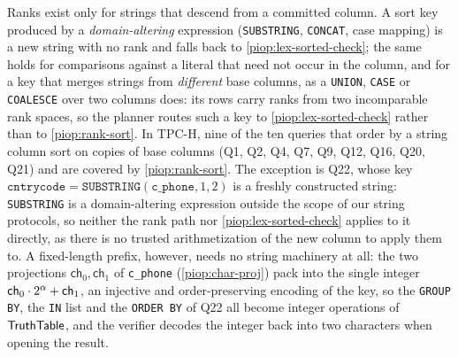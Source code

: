 Ranks exist only for strings that descend from a committed column. A sort key produced by a \emph{domain-altering} expression (\texttt{SUBSTRING}, \texttt{CONCAT}, case mapping) is a new string with no rank and falls back to \cref{piop:lex-sorted-check}; the same holds for comparisons against a literal that need not occur in the column, and for a key that merges strings from \emph{different} base columns, as a \texttt{UNION}, \texttt{CASE} or \texttt{COALESCE} over two columns does: its rows carry ranks from two incomparable rank spaces, so the planner routes such a key to \cref{piop:lex-sorted-check} rather than to \cref{piop:rank-sort}. In TPC-H, nine of the ten queries that order by a string column sort on copies of base columns (Q1, Q2, Q4, Q7, Q9, Q12, Q16, Q20, Q21) and are covered by \cref{piop:rank-sort}. The exception is Q22, whose key $\texttt{cntrycode} = \texttt{SUBSTRING}(\texttt{c\_phone}, 1, 2)$ is a freshly constructed string: \texttt{SUBSTRING} is a domain-altering expression outside the scope of our string protocols, so neither the rank path nor \cref{piop:lex-sorted-check} applies to it directly, as there is no trusted arithmetization of the new column to apply them to. A fixed-length prefix, however, needs no string machinery at all: the two projections $\mathsf{ch}_0, \mathsf{ch}_1$ of \texttt{c\_phone} (\cref{piop:char-proj}) pack into the single integer $\mathsf{ch}_0 \cdot 2^{\alpha} + \mathsf{ch}_1$, an injective and order-preserving encoding of the key, so the \texttt{GROUP BY}, the \texttt{IN} list and the \texttt{ORDER BY} of Q22 all become integer operations of $\mathsf{TruthTable}$, and the verifier decodes the integer back into two characters when opening the result.
